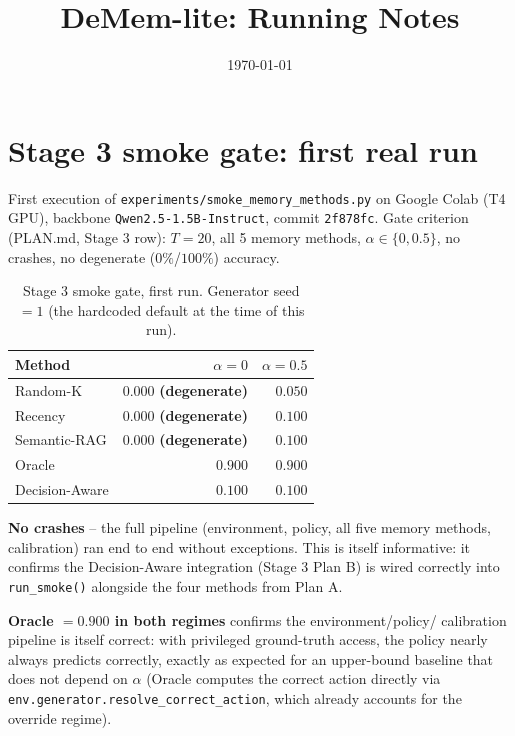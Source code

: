 \documentclass[11pt]{article}
\title{DeMem-lite: Running Notes}
\author{}
\date{\today}
\begin{document}
\maketitle

\section{Stage 3 smoke gate: first real run}
\label{sec:smoke-first-run}

First execution of \texttt{experiments/smoke\_memory\_methods.py} on Google
Colab (T4 GPU), backbone \texttt{Qwen2.5-1.5B-Instruct}, commit
\texttt{2f878fc}. Gate criterion (PLAN.md, Stage 3 row): $T=20$, all 5
memory methods, $\alpha \in \{0, 0.5\}$, no crashes, no degenerate
($0\%$/$100\%$) accuracy.

\begin{table}[h]
\centering
\begin{tabular}{lrr}
\toprule
Method & $\alpha=0$ & $\alpha=0.5$ \\
\midrule
Random-K       & $0.000$ \textbf{(degenerate)} & $0.050$ \\
Recency        & $0.000$ \textbf{(degenerate)} & $0.100$ \\
Semantic-RAG   & $0.000$ \textbf{(degenerate)} & $0.100$ \\
Oracle         & $0.900$                        & $0.900$ \\
Decision-Aware & $0.100$                        & $0.100$ \\
\bottomrule
\end{tabular}
\caption{Stage 3 smoke gate, first run. Generator seed $=1$ (the
hardcoded default at the time of this run).}
\label{tab:smoke-run1}
\end{table}

\textbf{No crashes} -- the full pipeline (environment, policy, all five
memory methods, calibration) ran end to end without exceptions. This is
itself informative: it confirms the Decision-Aware integration (Stage 3
Plan B) is wired correctly into \texttt{run\_smoke()} alongside the four
methods from Plan A.

\textbf{Oracle $=0.900$ in both regimes} confirms the environment/policy/
calibration pipeline is itself correct: with privileged ground-truth
access, the policy nearly always predicts correctly, exactly as expected
for an upper-bound baseline that does not depend on $\alpha$ (Oracle
computes the correct action directly via
\texttt{env.generator.resolve\_correct\_action}, which already accounts
for the override regime).
\end{document}
